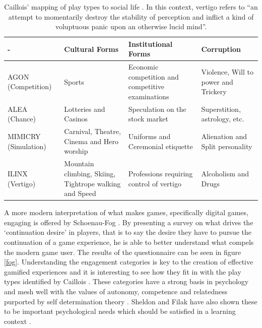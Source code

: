 \documentclass[12pt,a4paper,twoside]{report}
\begin{document}
\begin{table}
	\begin{center}
	\begin{tabu} to \textwidth {|X|X|X|X|}
		\hline - & Cultural Forms & Institutional Forms & Corruption \\ 
		\hline AGON (Competition) & Sports & Economic competition and competitive examinations & Violence, Will to power and Trickery \\ 
		\hline ALEA (Chance) & Lotteries and Casinos & Speculation on the stock market & Superstition, astrology, etc. \\ 
		\hline MIMICRY (Simulation) & Carnival, Theatre, Cinema and Hero worship & Uniforms and Ceremonial etiquette & Alienation and Split personality \\ 
		\hline ILINX (Vertigo) & Mountain climbing, Skiing, Tightrope walking and Speed & Professions requiring control of vertigo & Alcoholism and Drugs \\ 
		\hline 
	\end{tabu}
	\end{center}
	\caption{Caillois' mapping of play types to social life \cite{caillois1961man}. In this context, vertigo refers to ``an attempt to momentarily destroy the stability of perception and inflict a kind of voluptuous panic upon an otherwise lucid mind''.}
	\label{table:corruption}
\end{table}

A more modern interpretation of what makes games, specifically digital games, engaging is offered by Schoenau-Fog \cite{schoenau2011player}. By presenting a survey on what drives the `continuation desire' in players, that is to say the desire they have to pursue the continuation of a game experience, he is able to better understand what compels the modern game user. The results of the questionnaire can be seen in figure \ref{fog}. Understanding the engagement categories is key to the creation of effective gamified experiences and it is interesting to see how they fit in with the play types identified by Caillois \cite{caillois1961man}. These categories have a strong basis in psychology and mesh well with the values of autonomy, competence and relatedness purported by self determination theory \cite{deci1985intrinsic}. Sheldon and Filak have also shown these to be important psychological needs which should be satisfied in a learning context \cite{sheldon2008manipulating}.
\end{document}
